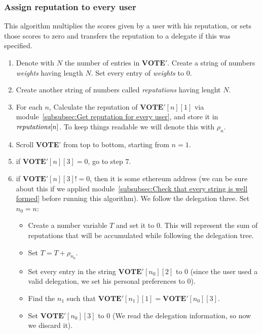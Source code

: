\documentclass[submission, copyright,creativecommons,sharealike,noncommercial]{eptcs}
\newcommand{\Vote}{\textbf{VOTE}\xspace}
\begin{document}
\subsubsection{Assign reputation to every user}\label{subsubsec:Assign reputation to every user}
	This algorithm multiplies the scores given by a user with his reputation, or sets those scores to zero and transfers the reputation to a delegate if this was specified.
	\begin{enumerate}
		\item Denote with $N$ the number of entries in $\Vote'$. Create a string of numbers \emph{weights} having length $N$. Set every entry of \emph{weights} to $0$. 
		
		\item Create another string of numbers called \emph{reputations} having lenght $N$.
		
		\item For each $n$, Calculate the reputation of $\Vote'[n][1]$ via module~\ref{subsubsec:Get reputation for every user}, and store it in $\emph{reputations}[n]$. To keep things readable we will denote this with $\rho_{n}$.
		
		
		\item Scroll \Vote' from top to bottom, starting from $n=1$.
	
		\item if $\Vote'[n][3]=0$, go to step $7$.
	
		\item if $\Vote'[n][3]!=0$, then it is some ethereum address (we can be sure about this if we applied module~\ref{subsubsec:Check that every string is well formed} before running this algorithm). We follow the delegation three. Set $n_0=n$:
		\begin{itemize}
			\item Create a number variable $T$ and set it to $0$. This will represent the sum of reputations that will be accumulated while following the delegation tree.

			\item Set $T = T + \rho_{n_0}$. 
		
			\item Set every entry in the string $\Vote'[n_0][2]$ to $0$ (since the user used a valid delegation, we set his personal preferences to $0$).
			
			\item Find the $n_1$ such that $\Vote'[n_1][1] = \Vote'[n_0][3]$.
			
			\item Set $\Vote'[n_0][3]$ to $0$ (We read the delegation information, so now we discard it).
			

\end{itemize}
\end{enumerate}
\end{document}
